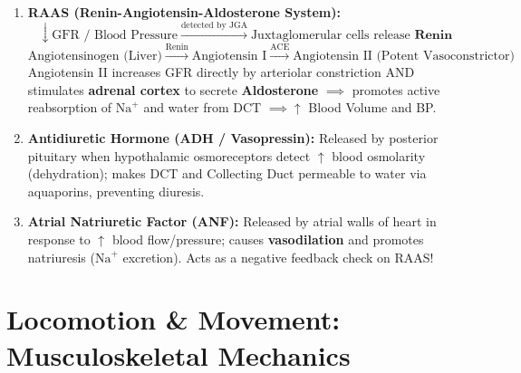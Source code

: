 \documentclass[10pt,a4paper]{article}
\begin{document}
\begin{conceptbox}
\begin{enumerate}[leftmargin=*]
  \item \textbf{RAAS (Renin-Angiotensin-Aldosterone System):}
  \begin{equation}
    \downarrow \text{GFR / Blood Pressure} \xrightarrow{\text{detected by JGA}} \text{Juxtaglomerular cells release } \mathbf{Renin}
  \end{equation}
  \begin{equation}
    \text{Angiotensinogen (Liver)} \xrightarrow{\text{Renin}} \text{Angiotensin I} \xrightarrow{\text{ACE}} \text{Angiotensin II (Potent Vasoconstrictor)}
  \end{equation}
  Angiotensin II increases GFR directly by arteriolar constriction AND stimulates \textbf{adrenal cortex} to secrete \textbf{Aldosterone} $\implies$ promotes active reabsorption of $\mathrm{Na}^+$ and water from DCT $\implies \uparrow$ Blood Volume and BP.
  \item \textbf{Antidiuretic Hormone (ADH / Vasopressin):} Released by posterior pituitary when hypothalamic osmoreceptors detect $\uparrow$ blood osmolarity (dehydration); makes DCT and Collecting Duct permeable to water via aquaporins, preventing diuresis.
  \item \textbf{Atrial Natriuretic Factor (ANF):} Released by atrial walls of heart in response to $\uparrow$ blood flow/pressure; causes \textbf{vasodilation} and promotes natriuresis ($\mathrm{Na}^+$ excretion). Acts as a negative feedback check on RAAS!
\end{enumerate}
\end{conceptbox}

\section{Locomotion \& Movement: Musculoskeletal Mechanics}
\end{document}
